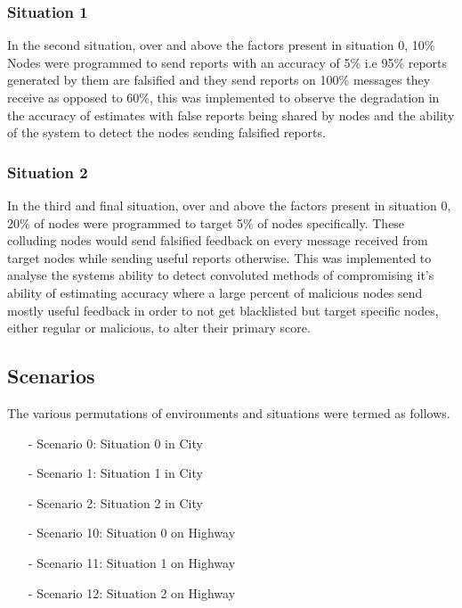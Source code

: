\documentclass[journal]{IEEEtran}
\begin{document}
\subsubsection{Situation 1}
\label{sec:Experiments:sit1}
In the second situation, over and above the factors present in situation 0, 10\% Nodes were programmed to send reports with an accuracy of 5\% i.e 95\% reports generated by them are falsified and they send reports on 100\% messages they receive as opposed to 60\%, this was implemented to observe the degradation in the accuracy of estimates with false reports being shared by nodes and the ability of the system to detect the nodes sending falsified reports.
\subsubsection{Situation 2}
\label{sec:Experiments:sit2}
In the third and final situation, over and above the factors present in situation 0, 20\% of nodes were programmed to target 5\% of nodes specifically. These colluding nodes would send falsified feedback on every message received from target nodes while sending useful reports otherwise. This was implemented to analyse the systems ability to detect convoluted methods of compromising it's ability of estimating accuracy where a large percent of malicious nodes send mostly useful feedback in order to not get blacklisted but target specific nodes, either regular or malicious, to alter their primary score.
\subsection{Scenarios}
The various permutations of environments and situations were termed as follows.
\begin{itemize}
	\item[-] Scenario 0: Situation 0 in City
	\item[-] Scenario 1: Situation 1 in City
	\item[-] Scenario 2: Situation 2 in City
	\item[-] Scenario 10: Situation 0 on Highway
	\item[-] Scenario 11: Situation 1 on Highway
	\item[-] Scenario 12: Situation 2 on Highway
\end{itemize}
\end{document}

